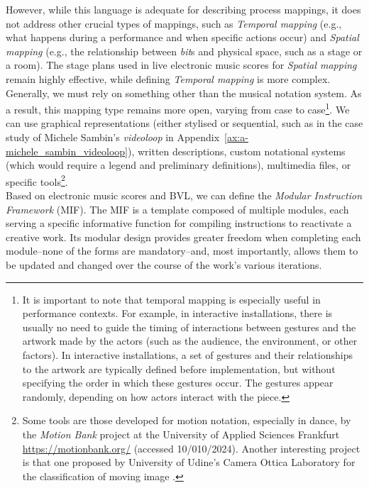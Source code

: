 However, while this language is adequate for describing process mappings, it does not address other crucial types of mappings, such as \textit{Temporal mapping} (e.g., what happens during a performance and when specific actions occur) and \textit{Spatial mapping} (e.g., the relationship between \textit{bit}s and physical space, such as a stage or a room). The stage plans used in live electronic music scores for \textit{Spatial mapping} remain highly effective, while defining \textit{Temporal mapping} is more complex. Generally, we must rely on something other than the musical notation system. As a result, this mapping type remains more open, varying from case to case\footnote{It is important to note that temporal mapping is especially useful in performance contexts. For example, in interactive installations, there is usually no need to guide the timing of interactions between gestures and the artwork made by the actors (such as the audience, the environment, or other factors). In interactive installations, a set of gestures and their relationships to the artwork are typically defined before implementation, but without specifying the order in which these gestures occur. The gestures appear randomly, depending on how actors interact with the piece.}. We can use graphical representations (either stylised or sequential, such as in the case study of Michele Sambin’s \textit{videoloop} in Appendix~\ref{ax:a-michele_sambin_videoloop}), written descriptions, custom notational systems (which would require a legend and preliminary definitions), multimedia files, or specific tools\footnote{Some tools are those developed for motion notation, especially in dance, by the \textit{Motion Bank} project at the University of Applied Sciences Frankfurt \url{https://motionbank.org/} (accessed 10/010/2024). Another interesting project is that one proposed by University of Udine’s Camera Ottica Laboratory for the classification of moving image \cite{costronuovo2024toward}.}.\\
Based on electronic music scores and BVL, we can define the \textit{Modular Instruction Framework} (MIF). The MIF is a template composed of multiple modules, each serving a specific informative function for compiling instructions to reactivate a creative work. Its modular design provides greater freedom when completing each module–none of the forms are mandatory–and, most importantly, allows them to be updated and changed over the course of the work’s various iterations.
